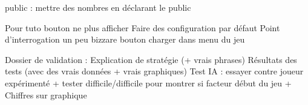 public : mettre des nombres en déclarant le public

Pour tuto bouton ne plus afficher
Faire des configuration par défaut
Point d'interrogation un peu bizzare
bouton charger dans menu du jeu

Dossier de validation : 
Explication de stratégie (+ vrais phrases)
Résultats des tests (avec des vrais données + vrais graphiques)
Test IA : essayer contre joueur expérimenté  + tester difficile/difficile pour montrer si facteur début du jeu
+ Chiffres sur graphique
